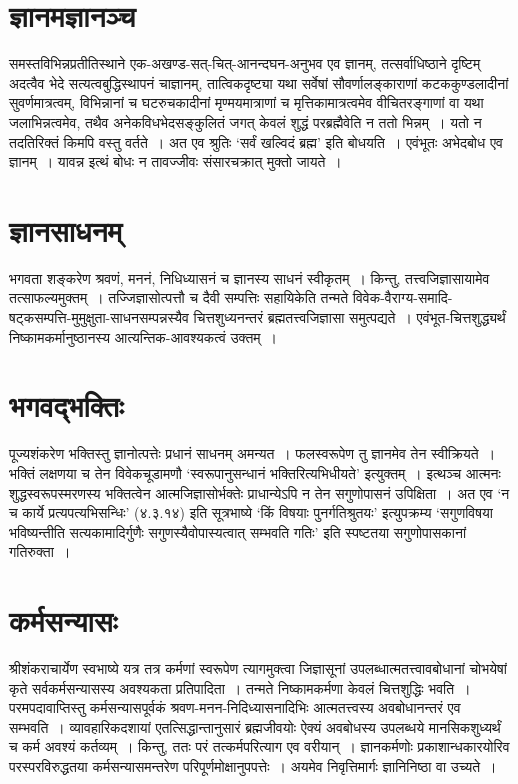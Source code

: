 {\section*{ज्ञानमज्ञानञ्च}

समस्तविभिन्नप्रतीतिस्थाने एक-अखण्ड-सत्-चित्-आनन्दघन-अनुभव एव ज्ञानम्, तत्सर्वाधिष्ठाने दृष्टिम् अदत्वैव भेदे सत्यत्वबुद्धिस्थापनं चाज्ञानम्, तात्विकदृष्ट्या यथा सर्वेषां सौवर्णालङ्काराणां कटककुण्डलादीनां सुवर्णमात्रत्वम्, विभिन्नानां च घटरुचकादीनां मृण्मयमात्राणां च मृत्तिकामात्रत्वमेव वीचितरङ्गाणां वा यथा जलाभिन्नत्वमेव, तथैव अनेकविधभेदसङ्कुलितं जगत् केवलं शुद्धं परब्रह्मैवेति न ततो भिन्नम्~। यतो न तदतिरिक्तं किमपि वस्तु वर्तते~। अत एव श्रुतिः ‘सर्वं खल्विदं ब्रह्म’ इति बोधयति~। एवंभूतः अभेदबोध एव ज्ञानम्~। यावन्न इत्थं बोधः न तावज्जीवः संसारचक्रात् मुक्तो जायते~। 

\section*{ज्ञानसाधनम्}

भगवता शङ्करेण श्रवणं, मननं, निधिध्यासनं च ज्ञानस्य साधनं स्वीकृतम्~। किन्तु, तत्त्वजिज्ञासायामेव तत्साफल्यमुक्तम्~। तज्जिज्ञासोत्पत्तौ च दैवी सम्पत्तिः सहायिकेति तन्मते विवेक-वैराग्य-समादि-षट्कसम्पत्ति-मुमुक्षुता-साधनसम्पन्नस्यैव चित्तशुध्यनन्तरं ब्रह्मतत्त्वजिज्ञासा समुत्पद्यते~। एवंभूत-चित्तशुद्ध्यर्थं निष्कामकर्मानुष्ठानस्य आत्यन्तिक-आवश्यकत्वं उक्तम्~। 

\section*{भगवद्भक्तिः}

पूज्यशंकरेण भक्तिस्तु ज्ञानोत्पत्तेः प्रधानं साधनम् अमन्यत~। फलस्वरूपेण तु ज्ञानमेव तेन स्वीक्रियते~। भक्तिं लक्षणया च तेन विवेकचूडामणौ ‘स्वरूपानुसन्धानं भक्तिरित्यभिधीयते’ इत्युक्तम्~। इत्थञ्च आत्मनः शुद्धस्वरूपस्मरणस्य भक्तित्वेन आत्मजिज्ञासोर्भक्तेः प्राधान्येऽपि न तेन सगुणोपासनं उपिक्षिता~। अत एव ‘न च कार्ये प्रत्यपत्यभिसन्धिः’ (४.३.१४) इति सूत्रभाष्ये ‘किं विषयाः पुनर्गतिश्रुतयः’ इत्युपक्रम्य ‘सगुणविषया भविष्यन्तीति सत्यकामादिर्गुणैः सगुणस्यैवोपास्यत्वात् सम्भवति गतिः’ इति स्पष्टतया सगुणोपासकानां गतिरुक्ता~। 

\section*{कर्मसन्यासः}

श्रीशंकराचार्येण स्वभाष्ये यत्र तत्र कर्मणां स्वरूपेण त्यागमुक्त्वा जिज्ञासूनां उपलब्धात्मतत्त्वावबोधानां चोभयेषां कृते सर्वकर्मसन्यासस्य अवश्यकता प्रतिपादिता~। तन्मते निष्कामकर्मणा केवलं चित्तशुद्धिः भवति~। परमपदावाप्तिस्तु कर्मसन्यासपूर्वकं श्रवण-मनन-निदिध्या\-सनादिभिः आत्मतत्त्वस्य अवबोधानन्तरं एव सम्भवति~। व्यावहारिकदशायां एतत्सिद्धान्तानुसारं ब्रह्मजीवयोः ऐक्यं अवबोधस्य उपलब्धये मानसिकशुध्यर्थं च कर्म अवश्यं कर्तव्यम्~। किन्तु, ततः परं तत्कर्मपरित्याग एव वरीयान्~। ज्ञानकर्मणोः प्रकाशान्धकारयोरिव परस्परविरुद्धतया कर्मसन्यासमन्तरेण परिपूर्णमोक्षानुपपत्तेः~। अयमेव निवृत्तिमार्गः ज्ञानिनिष्ठा वा उच्यते~। 

}
